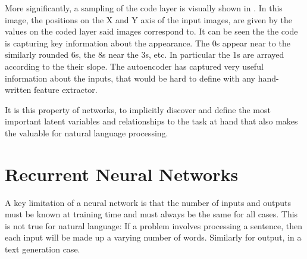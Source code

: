 \documentclass[12pt,parskip]{komatufte}\right
\begin{document}


More significantly, a sampling of the code layer is visually shown in .
In this image, the positions on the X and Y axis of the input images, are given by the values on the coded layer said images correspond to.
It can be seen the the code is capturing key information about the appearance.
The 0s appear near to the similarly rounded 6s,
the 8s near the 3s, etc.
In particular the 1s are arrayed according to the their slope.
The autoencoder has captured very useful information about the inputs, that would be hard to define with any hand-written feature extractor.

It is this property of networks, to implicitly discover and define the most important latent variables and relationships to the task at hand that also makes the valuable for natural language processing.


\section{Recurrent Neural Networks}\label{sec:rnn}

A key limitation of a neural network is that the number of inputs and outputs must be known at training time and must always be the same for all cases.
This is not true for natural language: If a problem involves processing a sentence, then each input will be made up a varying number of words. Similarly for output, in a text generation case.
\end{document}

